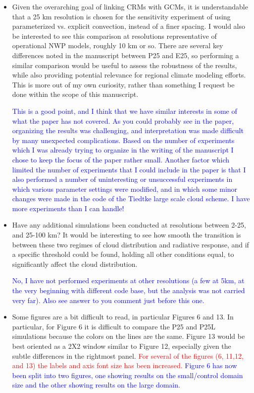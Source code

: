 \documentclass[draft]{agujournal2019}
\begin{document}
\begin{itemize}
  \item Given the overarching goal of linking CRMs with GCMs, it is understandable that a 25 km resolution is chosen for the sensitivity experiment of using parameterized vs. explicit convection, instead of a finer spacing. I would also be interested to see this comparison at resolutions representative of operational NWP models, roughly 10 km or so. There are several key differences noted in the manuscript between P25 and E25, so performing a similar comparison would be useful to assess the robustness of the results, while also providing potential relevance for regional climate modeling efforts. This is more out of my own curiosity, rather than something I request be done within the scope of this manuscript.  

  \textcolor{blue}{This is a good point, and I think that we have similar interests in some of what the paper has not covered.  As you could probably see in the paper, organizing the results was challenging, and interpretation was made difficult by many unexpected complications.  Based on the number of experiments which I was already trying to organize in the writing of the manuscript I chose to keep the focus of the paper rather small.   Another factor which limited the number of experiments that I could include in the paper is that I also performed a number of uninteresting or unsuccessful experiments in which various parameter settings were modified, and in which some minor changes were made in the code of the Tiedtke large scale cloud scheme.  I have more experiments than I can handle! }

  \item Have any additional simulations been conducted at resolutions between 2-25, and 25-100 km? It would be interesting to see how smooth the transition is between these two regimes of cloud distribution and radiative response, and if a specific threshold could be found, holding all other conditions equal, to significantly affect the cloud distribution.  

  \textcolor{blue}{No, I have not performed experiments at other resolutions (a few at 5km, at the very beginning with different code base, but the analysis was not carried very far).  Also see answer to you comment just before this one. }

  \item Some figures are a bit difficult to read, in particular Figures 6 and 13. In particular, for Figure 6 it is difficult to compare the P25 and P25L simulations because the colors on the lines are the same. Figure 13 would be best oriented as a 2X2 window similar to Figure 12, especially given the subtle differences in the rightmost panel.
  \textcolor{red}{For several of the figures (6, 11,12, and 13) the labels and axis font size has been increased.}  
  \textcolor{blue}{Figure 6 has now been split into two figures, one
  showing results on the small/control domain size and the other showing results on the large domain.}


\end{itemize}
\end{document}
